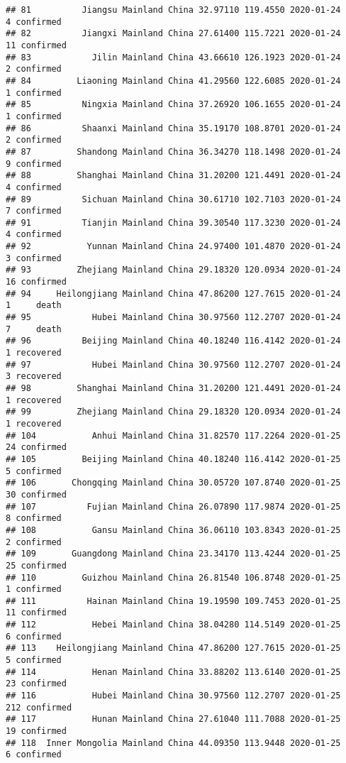 \documentclass[
]{article}
\begin{document}
\begin{verbatim}
## 81          Jiangsu Mainland China 32.97110 119.4550 2020-01-24     4 confirmed
## 82          Jiangxi Mainland China 27.61400 115.7221 2020-01-24    11 confirmed
## 83            Jilin Mainland China 43.66610 126.1923 2020-01-24     2 confirmed
## 84         Liaoning Mainland China 41.29560 122.6085 2020-01-24     1 confirmed
## 85          Ningxia Mainland China 37.26920 106.1655 2020-01-24     1 confirmed
## 86          Shaanxi Mainland China 35.19170 108.8701 2020-01-24     2 confirmed
## 87         Shandong Mainland China 36.34270 118.1498 2020-01-24     9 confirmed
## 88         Shanghai Mainland China 31.20200 121.4491 2020-01-24     4 confirmed
## 89          Sichuan Mainland China 30.61710 102.7103 2020-01-24     7 confirmed
## 91          Tianjin Mainland China 39.30540 117.3230 2020-01-24     4 confirmed
## 92           Yunnan Mainland China 24.97400 101.4870 2020-01-24     3 confirmed
## 93         Zhejiang Mainland China 29.18320 120.0934 2020-01-24    16 confirmed
## 94     Heilongjiang Mainland China 47.86200 127.7615 2020-01-24     1     death
## 95            Hubei Mainland China 30.97560 112.2707 2020-01-24     7     death
## 96          Beijing Mainland China 40.18240 116.4142 2020-01-24     1 recovered
## 97            Hubei Mainland China 30.97560 112.2707 2020-01-24     3 recovered
## 98         Shanghai Mainland China 31.20200 121.4491 2020-01-24     1 recovered
## 99         Zhejiang Mainland China 29.18320 120.0934 2020-01-24     1 recovered
## 104           Anhui Mainland China 31.82570 117.2264 2020-01-25    24 confirmed
## 105         Beijing Mainland China 40.18240 116.4142 2020-01-25     5 confirmed
## 106       Chongqing Mainland China 30.05720 107.8740 2020-01-25    30 confirmed
## 107          Fujian Mainland China 26.07890 117.9874 2020-01-25     8 confirmed
## 108           Gansu Mainland China 36.06110 103.8343 2020-01-25     2 confirmed
## 109       Guangdong Mainland China 23.34170 113.4244 2020-01-25    25 confirmed
## 110         Guizhou Mainland China 26.81540 106.8748 2020-01-25     1 confirmed
## 111          Hainan Mainland China 19.19590 109.7453 2020-01-25    11 confirmed
## 112           Hebei Mainland China 38.04280 114.5149 2020-01-25     6 confirmed
## 113    Heilongjiang Mainland China 47.86200 127.7615 2020-01-25     5 confirmed
## 114           Henan Mainland China 33.88202 113.6140 2020-01-25    23 confirmed
## 116           Hubei Mainland China 30.97560 112.2707 2020-01-25   212 confirmed
## 117           Hunan Mainland China 27.61040 111.7088 2020-01-25    19 confirmed
## 118  Inner Mongolia Mainland China 44.09350 113.9448 2020-01-25     6 confirmed

\end{verbatim}
\end{document}
